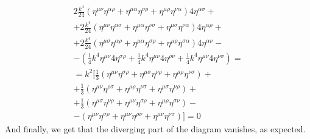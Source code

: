 \documentclass{article}
\begin{document}
\begin{equation}
\begin{gathered}
    2\frac{k^4}{24}\left(
        \eta^{\mu\nu}\eta^{\alpha\rho} +
        \eta^{\mu\alpha}\eta^{\nu\rho} +
        \eta^{\mu\rho}\eta^{\nu\alpha}
    \right)4\eta^{\alpha\sigma} + \\ +
    2\frac{k^4}{24}\left(
        \eta^{\mu\nu}\eta^{\alpha\sigma} +
        \eta^{\mu\alpha}\eta^{\nu\sigma} +
        \eta^{\mu\sigma}\eta^{\nu\alpha}
    \right)4\eta^{\alpha\rho} + \\ +
    2\frac{k^4}{24}\left(
        \eta^{\mu\sigma}\eta^{\alpha\rho} +
        \eta^{\mu\alpha}\eta^{\sigma\rho} +
        \eta^{\mu\rho}\eta^{\sigma\alpha}
    \right)4\eta^{\alpha\nu}
    - \\ -
    \left(
        \frac{1}{4}k^4 \eta^{\mu \nu} 4\eta^{\sigma\rho} +
        \frac{1}{4}k^4 \eta^{\mu \nu} 4\eta^{\rho\nu} +
        \frac{1}{4}k^4 \eta^{\mu \nu} 4\eta^{\nu\sigma}
    \right) = \\ =
    k^2 \Big[
    \frac{1}{3}\left(
        \eta^{\mu\nu}\eta^{\sigma\rho} +
        \eta^{\mu\sigma}\eta^{\nu\rho} +
        \eta^{\mu\rho}\eta^{\nu\sigma}
    \right) + \\ +
    \frac{1}{3}\left(
        \eta^{\mu\nu}\eta^{\rho\sigma} +
        \eta^{\mu\rho}\eta^{\nu\sigma} +
        \eta^{\mu\sigma}\eta^{\nu\rho}
    \right) + \\ +
    \frac{1}{3}\left(
        \eta^{\mu\sigma}\eta^{\nu\rho} +
        \eta^{\mu\nu}\eta^{\sigma\rho} +
        \eta^{\mu\rho}\eta^{\sigma\nu}
    \right)
    - \\ -
    \left(
        \eta^{\mu \nu} \eta^{\sigma\rho} +
        \eta^{\mu \nu} \eta^{\rho\nu} +
        \eta^{\mu \nu} \eta^{\nu\sigma}
    \right)
    \Big] = 0
\end{gathered}
\end{equation}
And finally, we get that the diverging part of the diagram vanishes, as expected.
\end{document}
